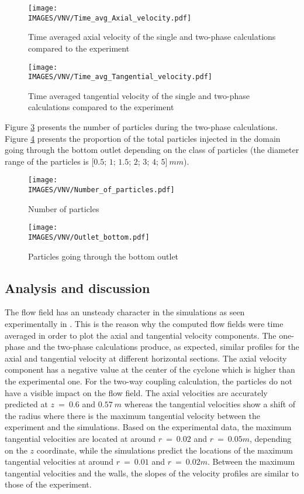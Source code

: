 \begin{figure}[H]
\centerline{\texttt{[image: \\IMAGES/VNV/Time\_avg\_Axial\_velocity.pdf]}}
\caption{Time averaged axial velocity of the single and two-phase calculations compared to the experiment}
\label{Time_avg_vit_ax}
\end{figure}

\begin{figure}[H]
\centerline{\texttt{[image: \\IMAGES/VNV/Time\_avg\_Tangential\_velocity.pdf]}}
\caption{Time averaged tangential velocity of the single and two-phase calculations compared to the experiment}
\label{Time_avg_vit_tg}
\end{figure}

Figure \ref{num_part} presents the number of particles during the two-phase calculations. Figure \ref{part_bot} presents the proportion of the total particles injected in the domain going through the bottom outlet depending on the class of particles (the diameter range of the particles is [$0.5$; $1$; $1.5$; $2$; $3$; $4$; $5$]$~mm$).

\begin{figure}[H]
\centerline{\texttt{[image: \\IMAGES/VNV/Number\_of\_particles.pdf]}}
\caption{Number of particles}
\label{num_part}
\end{figure}

\begin{figure}[H]
\centerline{\texttt{[image: \\IMAGES/VNV/Outlet\_bottom.pdf]}}
\caption{Particles going through the bottom outlet}
\label{part_bot}
\end{figure}

 
\subsection {Analysis and discussion}

The flow field has an unsteady character in the simulations as seen experimentally in \cite{Boysan83}. This is the reason why the computed flow fields were time averaged in order to plot the axial and tangential velocity components. The one-phase and the two-phase calculations produce, as expected, similar profiles for the axial and tangential velocity at different horizontal sections. The axial velocity component has a negative value at the center of the cyclone which is higher than the experimental one. For the two-way coupling calculation, the particles do not have a visible impact on the flow field. The axial velocities are accurately predicted at $z~=~0.6$ and $0.57~m$ whereas the tangential velocities show a shift of the radius where there is the maximum tangential velocity between the experiment and the simulations. Based on the experimental data, the maximum tangential velocities are located at around $r~=~0.02$ and $r~=~0.05m$, depending on the $z$ coordinate, while the simulations predict the locations of the maximum tangential velocities at around $r~=~0.01$ and $r~=~0.02m$. Between the maximum tangential velocities and the walls, the slopes of the velocity profiles are similar to those of the experiment.

